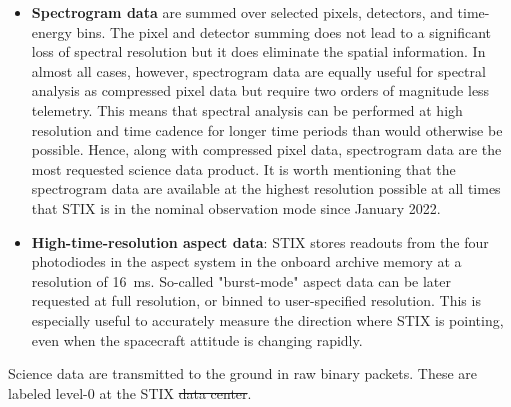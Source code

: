 \documentclass[referee]{aa} %
\providecommand{\DIFaddtex}[1]{{\protect\color{blue}\uwave{#1}}} %
\providecommand{\DIFdeltex}[1]{{\protect\color{red}\sout{#1}}}                      %
\providecommand{\DIFaddbegin}{} %
\providecommand{\DIFaddend}{} %
\providecommand{\DIFdelbegin}{} %
\providecommand{\DIFdelend}{} %
\providecommand{\DIFadd}[1]{\texorpdfstring{\DIFaddtex{#1}}{#1}} %
\providecommand{\DIFdel}[1]{\texorpdfstring{\DIFdeltex{#1}}{}} %
\newcommand{\DIFscaledelfig}{0.5}
\newlength{\DIFdelgraphicswidth} %
\newlength{\DIFdelgraphicsheight} %
\newcommand{\DIFaddincludegraphics}[2][]{{\color{blue}\fbox{\DIFOincludegraphics[#1]{#2}}}} %
\newcommand{\DIFdelincludegraphics}[2][]{%
\sbox{\DIFdelgraphicsbox}{\DIFOincludegraphics[#1]{#2}}%
\settoboxwidth{\DIFdelgraphicswidth}{\DIFdelgraphicsbox} %
\settoboxtotalheight{\DIFdelgraphicsheight}{\DIFdelgraphicsbox} %
\scalebox{\DIFscaledelfig}{%
\parbox[b]{\DIFdelgraphicswidth}{\usebox{\DIFdelgraphicsbox}\\[-\baselineskip] \rule{\DIFdelgraphicswidth}{0em}}\llap{\resizebox{\DIFdelgraphicswidth}{\DIFdelgraphicsheight}{%
\setlength{\unitlength}{\DIFdelgraphicswidth}%
\begin{picture}(1,1)%
\thicklines\linethickness{2pt} %
{\color[rgb]{1,0,0}\put(0,0){\framebox(1,1){}}}%
{\color[rgb]{1,0,0}\put(0,0){\line( 1,1){1}}}%
{\color[rgb]{1,0,0}\put(0,1){\line(1,-1){1}}}%
\end{picture}%
}\hspace*{3pt}}} %
} %
\DeclareRobustCommand{\DIFaddbegin}{\DIFOaddbegin \let\includegraphics\DIFaddincludegraphics} %
\DeclareRobustCommand{\DIFaddend}{\DIFOaddend \let\includegraphics\DIFOincludegraphics} %
\DeclareRobustCommand{\DIFdelbegin}{\DIFOdelbegin \let\includegraphics\DIFdelincludegraphics} %
\DeclareRobustCommand{\DIFdelend}{\DIFOaddend \let\includegraphics\DIFOincludegraphics} %
\begin{document}
\begin{itemize}
\item {\bf Spectrogram data} are summed over selected pixels, detectors, and time-energy bins. The pixel and detector summing does not lead to a significant loss of spectral resolution but it does eliminate the spatial information.  In almost all cases, however, spectrogram data are equally useful for spectral analysis as compressed pixel data but require two orders of magnitude less telemetry.  This means that spectral analysis can be performed at high resolution and time cadence for longer time periods than would otherwise be possible.  Hence, along with compressed pixel data, spectrogram data are the most requested science data product. It is worth mentioning that the spectrogram data are available at the highest resolution possible at all times that STIX is in the nominal observation mode since January 2022. 

\item {\bf High-time-resolution aspect data}: STIX stores readouts from the four photodiodes in the aspect system in the onboard archive memory at a resolution of 16~ms. So-called "burst-mode" aspect data can be later requested at full resolution, or binned to user-specified resolution. This is especially useful to accurately measure the direction where STIX is pointing, even when the spacecraft attitude is changing rapidly.
\end{itemize}
Science data are transmitted to the ground in raw binary packets.  
These are labeled level-0 at the STIX \DIFdelbegin \DIFdel{data center}\DIFdelend \DIFaddbegin \DIFadd{Data Center}\DIFaddend .  
\end{document}
